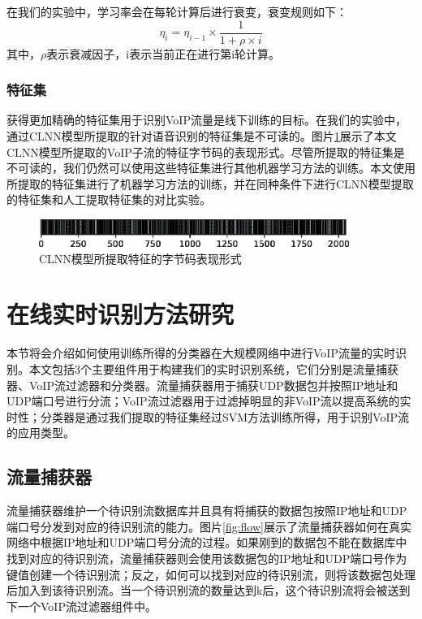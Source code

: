 在我们的实验中，学习率会在每轮计算后进行衰变，衰变规则如下：
\begin{equation}
\label{equ:decay}
{\eta _i} = {\eta _{i - 1}} \times \frac{1}{{1 + \rho  \times i}}
\end{equation}
其中，${\rho }$表示衰减因子，i表示当前正在进行第i轮计算。

\subsubsection{特征集}
获得更加精确的特征集用于识别VoIP流量是线下训练的目标。在我们的实验中，通过CLNN模型所提取的针对语音识别的特征集是不可读的。图片\ref{fig:feature}展示了本文CLNN模型所提取的VoIP子流的特征字节码的表现形式。尽管所提取的特征集是不可读的，我们仍然可以使用这些特征集进行其他机器学习方法的训练。本文使用所提取的特征集进行了机器学习方法的训练，并在同种条件下进行CLNN模型提取的特征集和人工提取特征集的对比实验。
\begin{figure}[thb]
\begin{center}
\includegraphics[width=0.9\textwidth]{figures/feature.eps}
\caption{CLNN模型所提取特征的字节码表现形式}\label{fig:feature}
\end{center}
\end{figure}

\section{在线实时识别方法研究}
\label{sec:onlineidentification}
本节将会介绍如何使用训练所得的分类器在大规模网络中进行VoIP流量的实时识别。本文包括3个主要组件用于构建我们的实时识别系统，它们分别是流量捕获器、VoIP流过滤器和分类器。流量捕获器用于捕获UDP数据包并按照IP地址和UDP端口号进行分流；VoIP流过滤器用于过滤掉明显的非VoIP流以提高系统的实时性；分类器是通过我们提取的特征集经过SVM方法训练所得，用于识别VoIP流的应用类型。

\subsection{流量捕获器}
流量捕获器维护一个待识别流数据库并且具有将捕获的数据包按照IP地址和UDP端口号分发到对应的待识别流的能力。图片\ref{fig:flow}展示了流量捕获器如何在真实网络中根据IP地址和UDP端口号分流的过程。如果刚到的数据包不能在数据库中找到对应的待识别流，流量捕获器则会使用该数据包的IP地址和UDP端口号作为键值创建一个待识别流；反之，如何可以找到对应的待识别流，则将该数据包处理后加入到该待识别流。当一个待识别流的数量达到k后，这个待识别流将会被送到下一个VoIP流过滤器组件中。


